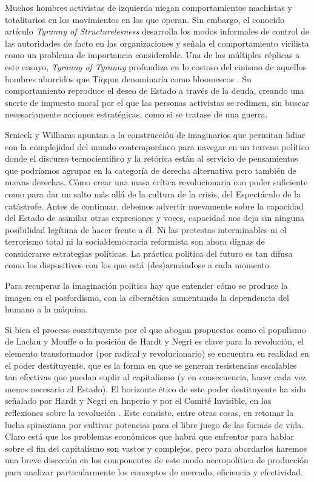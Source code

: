 Muchos hombres activistas de izquierda niegan comportamientos machistas y totalitarios en los movimientos en los que operan. Sin embargo, el conocido artículo \emph{Tyranny of Structurelesness} desarrolla los modos informales de control de las autoridades de facto en las organizaciones y señala el comportamiento virilista como un problema de importancia considerable. Una de las múltiples réplicas a este ensayo, \emph{Tyranny of Tyranny} profundiza en lo costoso del cinismo de aquellos hombres aburridos que Tiqqun denominaría como bloomescos \autocite{TyrannyTyranny}. Su comportamiento reproduce el deseo de Estado a través de la deuda, creando una suerte de impuesto moral por el que las personas activistas se redimen, sin buscar necesariamente acciones estratégicas, como si se tratase de una guerra.

Srnicek y Williams apuntan a la construcción de imaginarios que permitan lidiar con la complejidad del mundo contemporáneo para navegar en un terreno político donde el discurso tecnocientífico y la retórica están al servicio de pensamientos que podríamos agrupar en la categoría de derecha alternativa pero también de nuevas derechas. Cómo crear una masa crítica revolucionaria con poder suficiente como para dar un salto más allá de la cultura de la crisis, del Espectáculo de la catástrofe. Antes de continuar, debemos advertir nuevamente sobre la capacidad del Estado de asimilar otras expresiones y voces, capacidad nos deja sin ninguna posibilidad legítima de hacer frente a él. Ni las protestas interminables ni el terrorismo total ni la socialdemocracia reformista son ahora dignas de considerarse estrategias políticas. La práctica política del futuro es tan difusa como los dispositivos con los que está (des)armándose a cada momento.

Para recuperar la imaginación política hay que entender cómo se produce la imagen en el posfordismo, con la cibernética aumentando la dependencia del humano a la máquina.

Si bien el proceso constituyente por el que abogan propuestas como el populismo de Laclau y Mouffe \autocite{laclauRazonPopulista2016} o la posición de Hardt y Negri \autocite{hardtImperio2005} es clave para la revolución, el elemento transformador (por radical y revolucionario) se encuentra en realidad en el poder destituyente, que es la forma en que se generan resistencias escalables tan efectivas que puedan suplir al capitalismo (y en consecuencia, hacer cada vez menos necesario al Estado). El horizonte ético de este poder destituyente ha sido señalado por Hardt y Negri en Imperio y por el Comité Invisible, en las reflexiones sobre la revolución \autocite{comiteinvisibleAhora2017}. Este consiste, entre otras cosas, en retomar la lucha spinoziana por cultivar potencias para el libre juego de las formas de vida. Claro está que los problemas económicos que habrá que enfrentar para hablar sobre el fin del capitalismo son vastos y complejos, pero para abordarlos haremos una breve disección en los componentes de este modo necropolítico de producción para analizar particularmente los conceptos de mercado, eficiencia y efectividad.

